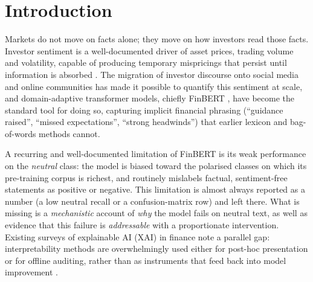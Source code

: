 \documentclass{aims}
\numberwithin{equation}{section}
\begin{document}

\maketitle
\linenumbers

\section{Introduction}
Markets do not move on facts alone; they move on how investors read those facts.
Investor sentiment is a well-documented driver of asset prices, trading volume and
volatility, capable of producing temporary mispricings that persist until
information is absorbed \citep{tetlock2007,baker2006}. The migration of investor
discourse onto social media and online communities has made it possible to
quantify this sentiment at scale, and domain-adaptive transformer models, chiefly
FinBERT \citep{araci2019}, have become the standard tool for doing so, capturing
implicit financial phrasing (``guidance raised'', ``missed expectations'', ``strong
headwinds'') that earlier lexicon and bag-of-words methods cannot.

A recurring and well-documented limitation of FinBERT is its weak performance on
the \emph{neutral} class: the model is biased toward the polarised classes on
which its pre-training corpus is richest, and routinely mislabels factual,
sentiment-free statements as positive or negative. This limitation is almost
always reported as a number (a low neutral recall or a confusion-matrix row) and
left there. What is missing is a \emph{mechanistic} account of \emph{why} the model fails on neutral text, 
as well as evidence that this failure is \emph{addressable} with a proportionate intervention. Existing surveys of
explainable AI (XAI) in finance note a parallel gap: interpretability methods are
overwhelmingly used either for post-hoc presentation or for offline auditing,
rather than as instruments that feed back into model improvement
\citep{yeo2025}.
\end{document}
